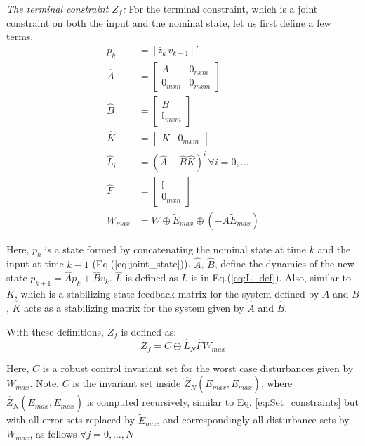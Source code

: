 \textit{The terminal constraint $Z_f$:}
For the terminal constraint, which is a joint constraint on both the input and the nominal state, let us first define a few terms.
\begin{subequations}
\begin{align}
p_k &=[\bar{z}_k \, v_{k-1}]' \label{eq:joint_state} \\
\hat{A} &= \begin{bmatrix} A & 0_{nxm} \\ 0_{mxn} & 0_{mxm}   \end{bmatrix} \label{eq:A_hat} \\
\hat{B} &= \begin{bmatrix}  B \\ \mathbb{I}_{mxm} \end{bmatrix} \label{eq:B_hat} \\
\hat{K} &= \begin{bmatrix}  K & 0_{mxm}  \end{bmatrix} \label{eq:K_hat} \\
\hat{L} _i&= (\hat{A}+\hat{B}\hat{K})^i\,\forall i = 0,\dotsc \label{eq:L_hat} \\
\hat{F} &= \begin{bmatrix} \mathbb{I} \\ 0_{mxn} \end{bmatrix} \\
W_{max} &= W \oplus \tilde{E}_{max} \oplus (-A\tilde{E}_{max}) \label{eq:W_max} 
\end{align}
\end{subequations}

Here, $p_k$ is a state formed by concatenating the nominal state at time $k$ and the input at time $k-1$ (Eq.(\ref{eq:joint_state})). $\hat{A}$, $\hat{B}$, define the dynamics of the new state $p_{k+1} = \hat{A}p_{k} + \hat{B}v_k$. $\hat{L}$ is defined as $L$ is in Eq.(\ref{eq:L_def}). Also, similar to $K$, which is a stabilizing state feedback matrix for the system defined by $A$ and $B$, $\hat{K}$ acts as a stabilizing matrix for the system given by $\hat{A}$ and $\hat{B}$.

With these definitions, $Z_f$ is defined as:
\begin{equation}
Z_f = C\ominus \hat{L}_N\hat{F}{W}_{max}
\end{equation}

Here, $C$ is a robust control invariant set for the worst case disturbances given by $W_{max}$. Note. $C$ is the invariant set inside $\hat{Z}_N(\tilde{E}_{max},\tilde{E}_{max})$, where $\hat{Z}_N(\tilde{E}_{max},\tilde{E}_{max})$ is computed recursively, similar to Eq. \ref{eq:Set_constraints} but with all error sets replaced by $\tilde{E}_{max}$ and correspondingly all disturbance sets by $W_{max}$, as follows $\forall j=0,\dotsc,N$


